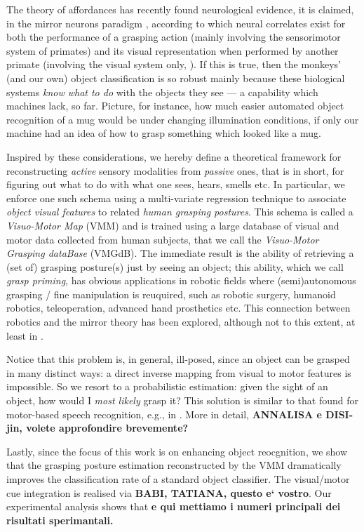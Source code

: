 The theory of affordances has recently found neurological evidence,
it is claimed, in the mirror neurons paradigm \cite{gallese-96,rizzolatti-04}, according to which
neural correlates exist for both the performance of a grasping
action (mainly involving the sensorimotor system of primates) and its visual
representation when performed by another primate (involving the visual system only,
\cite{umilta-01}).
If this is true, then the monkeys' (and our own) object classification is
so robust mainly because these biological systems \emph{know what to do} with the
objects they see --- a capability which machines lack, so far. Picture, for instance,
how much easier automated object recognition of a mug would be under changing illumination
conditions, if only our machine had an idea of how to grasp something which looked like
a mug.

Inspired by these considerations, we hereby define a theoretical framework for
reconstructing \emph{active} sensory modalities from \emph{passive} ones, that is in
short, for figuring out what to do with what one sees, hears, smells etc. In particular,
we enforce one such schema using a multi-variate regression technique to associate
\emph{object visual features} to related \emph{human grasping postures}. This schema is
called a \emph{Visuo-Motor Map} (VMM) and is trained
using a large database of visual and motor data collected from human subjects, that
we call the \emph{Visuo-Motor Grasping dataBase} (VMGdB). The immediate result is the
ability of retrieving a (set of) grasping posture(s) just by seeing an object; this
ability, which we call \emph{grasp priming}, has obvious applications in robotic fields
where (semi)autonomous grasping / fine manipulation is reuquired, such as robotic surgery,
humanoid robotics, teleoperation, advanced hand prosthetics etc. This connection between
robotics and the mirror theory has been explored, although not to this extent, at
least in \cite{lopes-05,metta-06}.

Notice that this problem is, in general, ill-posed, since an object can be grasped in
many distinct ways: a direct inverse mapping from visual to motor features is impossible.
So we resort to a probabilistic estimation: given the sight of an object, how would I
\emph{most likely} grasp it? This solution is similar to that found for motor-based speech
recognition, e.g., in \cite{richmond2007}. More in detail, \textbf{ANNALISA e DISI-jin, volete
approfondire brevemente?}

Lastly, since the focus of this work is on enhancing object reocgnition, we show
that the grasping posture estimation reconstructed by the VMM dramatically improves the
classification rate of a standard object classifier. The visual/motor cue integration is
realised via \textbf{BABI, TATIANA, questo e` vostro}. Our experimental analysis shows
that \textbf{e qui mettiamo i numeri principali dei risultati sperimantali.}

